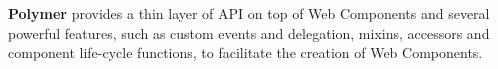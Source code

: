 {\bf Polymer} provides a thin layer of API on top of Web Components and several powerful features, such as custom events and delegation, mixins, accessors and component life-cycle functions, to facilitate the creation of Web Components. 


 


